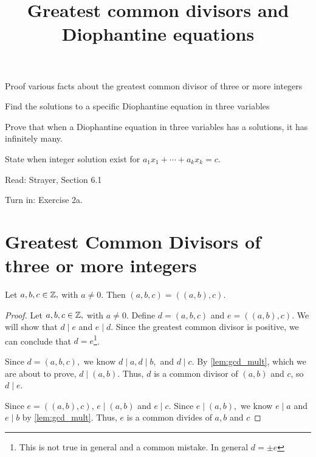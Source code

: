 \documentclass{ximera}
\title{Greatest common divisors and Diophantine equations}
\begin{document}
\begin{abstract}
\end{abstract}
\maketitle


\begin{obj}
	\item Proof various facts about the greatest common divisor of three or more integers
	\item Find the solutions to a specific Diophantine equation in three variables
    \item Prove that when a Diophantine equation in three variables has a solutions, it has infinitely many.
	\item State when integer solution exist for $a_1x_1+\cdots+a_kx_k=c$.
\end{obj}


\begin{pre}
	\item[Read:] Strayer, Section 6.1
	\item[Turn in:] Exercise 2a.
\end{pre}


\section{Greatest Common Divisors of three or more integers}
\begin{lemma}\label{lem:gcd_3case}
	Let $a,b,c\in\mathbb Z,$ with $a\neq 0$. Then $(a,b,c)=((a,b),c).$

 	\begin{proof}
 		Let $a,b,c\in\mathbb Z,$ with $a\neq 0$. Define $d=(a,b,c)$ and $e=((a,b),c).$ We will show that $d\mid e$ and $e\mid d$. Since the greatest common divisor is positive, we can conclude that $d=e$\footnote{This is not true in general and a common mistake. In general $d=\pm e$}.

 		Since $d=(a,b,c),$ we know $d\mid a, d\mid b,$ and $d\mid c$. By \cref{lem:gcd_mult}, which we are about to prove, $d\mid (a,b)$. Thus, $d$ is a common divisor of $(a,b)$ and $c$, so $d\mid e$.

 		Since $e=((a,b),c)$, $e\mid  (a,b)$ and $e\mid c$. Since $e\mid (a,b),$ we know $e\mid a$ and $e\mid b$ by \cref{lem:gcd_mult}. Thus, $e$ is a common divides of $a,b$ and $c$
 	\end{proof}
\end{lemma}
\end{document}
